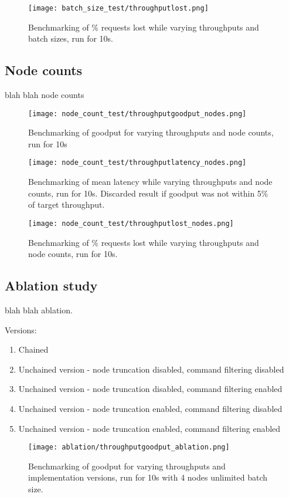 \begin{figure}[h!]
\centering
\texttt{[image: batch\_size\_test/throughputlost.png]}
\caption{Benchmarking of \% requests lost while varying throughputs and batch sizes, run for 10s.}
\end{figure}

\subsection{Node counts}
blah blah node counts

\begin{figure}[h!]
\centering
\texttt{[image: node\_count\_test/throughputgoodput\_nodes.png]}
\caption{Benchmarking of goodput for varying throughputs and node counts, run for 10s}
\end{figure}

\begin{figure}[h!]
\centering
\texttt{[image: node\_count\_test/throughputlatency\_nodes.png]}
\caption{Benchmarking of mean latency while varying throughputs and node counts, run for 10s. Discarded result if goodput was not within 5\% of target throughput.}
\end{figure}

\begin{figure}[h!]
\centering
\texttt{[image: node\_count\_test/throughputlost\_nodes.png]}
\caption{Benchmarking of \% requests lost while varying throughputs and node counts, run for 10s.}
\end{figure}

\subsection{Ablation study}
blah blah ablation.

Versions:
\begin{enumerate}
	\item Chained
	\item Unchained version - node truncation disabled, command filtering disabled
	\item Unchained version - node truncation disabled, command filtering enabled
	\item Unchained version - node truncation enabled, command filtering disabled
	\item Unchained version - node truncation enabled, command filtering enabled
\end{enumerate}

\begin{figure}[h!]
\centering
\texttt{[image: ablation/throughputgoodput\_ablation.png]}
\caption{Benchmarking of goodput for varying throughputs and implementation versions, run for 10s with 4 nodes unlimited batch size.}
\end{figure}

